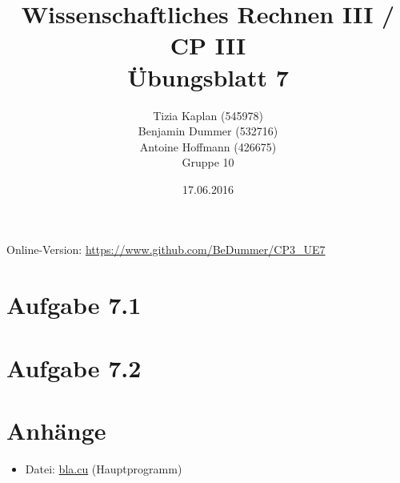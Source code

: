 \documentclass[%
	paper=A4,	%
	pagesize,	%
	DIV=calc,	%
	smallheadings,	%
	ngerman		%
]{scrartcl}
\title{{\bf Wissenschaftliches Rechnen III / CP III}\\Übungsblatt 7}
\author{Tizia Kaplan (545978)\\Benjamin Dummer (532716)\\Antoine Hoffmann (426675)\\Gruppe 10}
\date{17.06.2016}
\begin{document}
\maketitle
Online-Version: \href{https://www.github.com/BeDummer/CP3_UE7}{\url{https://www.github.com/BeDummer/CP3_UE7}}

\section*{Aufgabe 7.1}


\section*{Aufgabe 7.2}


\section*{Anhänge}
\begin{itemize}
	\item Datei: \url{bla.cu} (Hauptprogramm)
\end{itemize}
\end{document}

